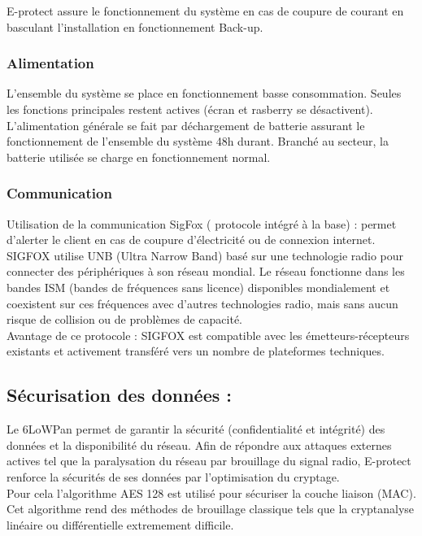 E-protect assure le fonctionnement du système en cas de coupure de courant en basculant l'installation en fonctionnement Back-up.\\

\subsubsection{Alimentation}
L'ensemble du système se place en fonctionnement basse consommation. Seules les fonctions principales restent actives (écran et rasberry se désactivent).\\
L'alimentation générale se fait par déchargement de batterie assurant le fonctionnement de l'ensemble du système 48h durant. Branché au secteur, la batterie utilisée se charge en fonctionnement normal.\\

\subsubsection{Communication}
Utilisation de la communication SigFox ( protocole intégré à la base) : permet d’alerter le client en cas de coupure d’électricité ou de connexion internet.\\
SIGFOX utilise UNB (Ultra Narrow Band) basé sur une technologie radio pour connecter des périphériques à son réseau mondial.
Le réseau fonctionne dans les bandes ISM (bandes de fréquences sans licence) disponibles mondialement et coexistent sur ces fréquences avec d'autres technologies radio, mais sans aucun risque de collision ou de problèmes de capacité.\\
Avantage de ce protocole : SIGFOX est compatible avec les émetteurs-récepteurs existants et activement transféré vers un nombre de plateformes techniques.\cite{www:Sigfox}\\



\subsection{Sécurisation des données :} 

Le 6LoWPan permet de garantir la sécurité (confidentialité et intégrité) des données et la disponibilité du réseau.
Afin de répondre aux attaques externes actives tel que la paralysation du réseau par brouillage du signal radio, E-protect renforce la sécurités de ses données par l'optimisation du cryptage.\\
Pour cela l'algorithme AES 128 est utilisé pour sécuriser la couche liaison (MAC). Cet algorithme rend des méthodes de brouillage classique tels que la cryptanalyse linéaire ou différentielle extremement difficile.\\


